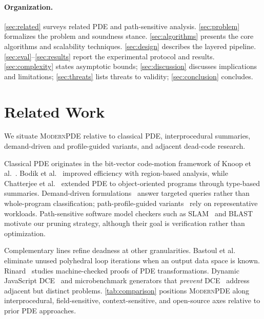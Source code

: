 \documentclass[acmsmall,screen,review,anonymous]{acmart}
\begin{document}
\paragraph{Organization.}
\autoref{sec:related} surveys related PDE and path-sensitive analysis. \autoref{sec:problem} formalizes the problem and soundness stance. \autoref{sec:algorithms} presents the core algorithms and scalability techniques. \autoref{sec:design} describes the layered pipeline. \autoref{sec:eval}--\autoref{sec:results} report the experimental protocol and results. \autoref{sec:complexity} states asymptotic bounds; \autoref{sec:discussion} discusses implications and limitations; \autoref{sec:threats} lists threats to validity; \autoref{sec:conclusion} concludes.

\section{Related Work}
\label{sec:related}
We situate \textsc{ModernPDE} relative to classical PDE, interprocedural summaries, demand-driven and profile-guided variants, and adjacent dead-code research.

Classical PDE originates in the bit-vector code-motion framework of Knoop et al.~\cite{knoop1994partial}. Bodik et al.~\cite{bodik1998efficient} improved efficiency with region-based analysis, while Chatterjee et al.~\cite{chatterjee2005interprocedural} extended PDE to object-oriented programs through type-based summaries. Demand-driven formulations~\cite{takimoto2012demand} answer targeted queries rather than whole-program classification; path-profile-guided variants~\cite{pathprofile2025} rely on representative workloads. Path-sensitive software model checkers such as SLAM~\cite{ball2001slam} and BLAST~\cite{henzinger2002blast} motivate our pruning strategy, although their goal is verification rather than optimization.

Complementary lines refine deadness at other granularities. Bastoul et al.~\cite{bastoul2025dead} eliminate unused polyhedral loop iterations when an output data space is known. Rinard~\cite{rinard2026nexis} studies machine-checked proofs of PDE transformations. Dynamic JavaScript DCE~\cite{kupoluyi2022muzeel} and microbenchmark generators that \emph{prevent} DCE~\cite{rodriguez2016autojmh} address adjacent but distinct problems. \autoref{tab:comparison} positions \textsc{ModernPDE} along interprocedural, field-sensitive, context-sensitive, and open-source axes relative to prior PDE approaches.
\end{document}

